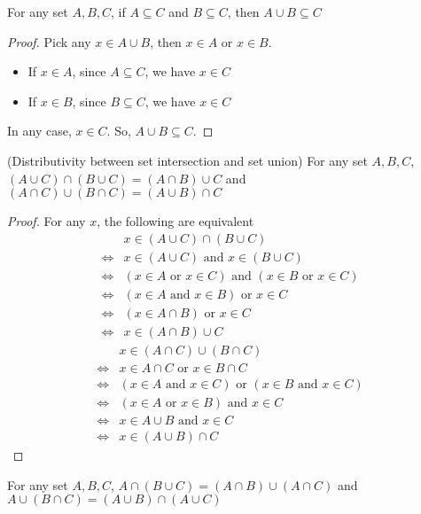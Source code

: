 \begin{prop}
    {For any set $A,B,C$, if $A\subseteq C$ and $B\subseteq C$, then $A\cup B\subseteq C$}\
\end{prop}
\begin{proof}
    Pick any $x\in A\cup B$, then $x\in A$ or $x\in B$. 
    \begin{itemize}
        \item If $x\in A$, since $A\subseteq C$, we have $x\in C$
        \item If $x\in B$, since $B\subseteq C$, we have $x\in C$
    \end{itemize}
    In any case, $x\in C$. So, $A\cup B\subseteq C$.
\end{proof}
\begin{prop}
    {(Distributivity between set intersection and set union) For any set $A,B,C$, $(A\cup C)\cap(B\cup C) = (A\cap B)\cup C$ and $(A\cap C)\cup (B\cap C) = (A\cup B) \cap C$}
\end{prop}
\begin{proof}
    For any $x$, the following are equivalent 
    \begin{align*}
        & x\in (A\cup C)\cap(B\cup C)\\
        \Leftrightarrow & x\in (A\cup C) \text{ and }x\in(B\cup C)\\
        \Leftrightarrow & (x\in A\text{ or }x\in C)\text{ and }(x\in B\text{ or }x\in C)\\
        \Leftrightarrow & (x\in A \text{ and }x\in B)\text{ or }x\in C\\
        \Leftrightarrow & (x\in A\cap B)\text{ or }x\in C\\
        \Leftrightarrow & x\in(A\cap B)\cup C
    \end{align*}
    \begin{align*}
        & x\in (A\cap C)\cup (B\cap C)\\
        \Leftrightarrow & x\in A\cap C \text{ or }x\in B\cap C\\
        \Leftrightarrow & (x\in A\text{ and }x\in C)\text{ or }(x\in B\text{ and }x\in C)\\
        \Leftrightarrow & (x\in A\text{ or }x\in B) \text{ and }x\in C\\
        \Leftrightarrow & x\in A\cup B \text{ and }x\in C\\
        \Leftrightarrow & x\in(A\cup B)\cap C
    \end{align*}
\end{proof}
\begin{cor}
    {For any set $A,B,C$, $A\cap (B\cup C) = (A\cap B)\cup  (A\cap C)$ and $A\cup(B\cap C) = (A\cup B)\cap (A\cup C)$}
\end{cor}
